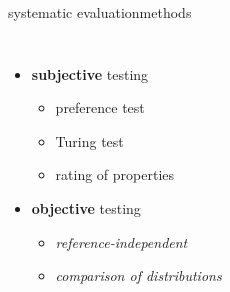 \begin{frame}{systematic evaluation}{methods}
    \vspace{-5mm}
    
    \begin{columns}
    \begin{itemize}
 
        \item<1->   \textbf{subjective} testing
            \begin{itemize}
                \item<2->   preference test
                \item<2->   Turing test
                \item<2->   rating of properties
            \end{itemize}
        \bigskip
        \item<3->   \textbf{objective} testing
            \begin{itemize}
                \item   \textit{reference-independent} 
                \item   \textit{comparison of distributions}
            \end{itemize}
    \end{itemize}
    \end{columns}
\end{frame}

